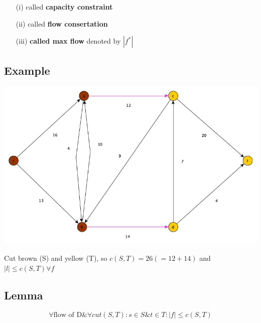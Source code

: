 \begin{itemize}
	\item[(i)] called \textbf{capacity constraint}
	
	\item[(ii)] called \textbf{flow consertation}
	
	\item[(iii)] \textbf{called max flow} denoted by $|f^*|$
	
\end{itemize}


\subsection{Example}
\begin{center}
	\includegraphics[scale=0.5]{img/graph6}
\end{center}

Cut brown (S) and yellow (T), so $c(S,T) = 26 (= 12+14)$ and
$|l| \leq  c(S,T) \forall  f $


\subsection{Lemma}

$$\forall \text{flow of D} \& \forall cut (S,T): s\in S \& t\in T: |f| \leq c(S,T)$$

